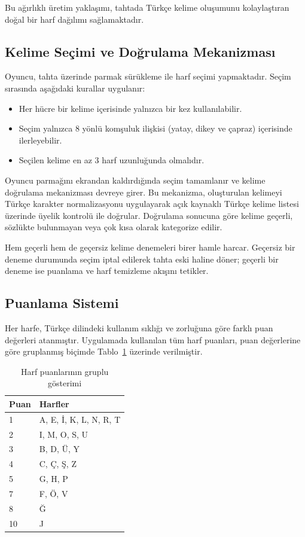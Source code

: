 \documentclass[conference]{IEEEtran}
\begin{document}
Bu ağırlıklı üretim yaklaşımı, tahtada Türkçe kelime oluşumunu kolaylaştıran doğal bir harf dağılımı sağlamaktadır.

\subsection{Kelime Seçimi ve Doğrulama Mekanizması}

Oyuncu, tahta üzerinde parmak sürükleme ile harf seçimi yapmaktadır. Seçim sırasında aşağıdaki kurallar uygulanır:

\begin{itemize}
  \item Her hücre bir kelime içerisinde yalnızca bir kez kullanılabilir.
  \item Seçim yalnızca 8 yönlü komşuluk ilişkisi (yatay, dikey ve çapraz) içerisinde ilerleyebilir.
  \item Seçilen kelime en az 3 harf uzunluğunda olmalıdır.
\end{itemize}

Oyuncu parmağını ekrandan kaldırdığında seçim tamamlanır ve kelime doğrulama mekanizması devreye girer. Bu mekanizma, oluşturulan kelimeyi Türkçe karakter normalizasyonu uygulayarak açık kaynaklı Türkçe kelime listesi \cite{turkish_word_list} üzerinde üyelik kontrolü ile doğrular. Doğrulama sonucuna göre kelime geçerli, sözlükte bulunmayan veya çok kısa olarak kategorize edilir.

Hem geçerli hem de geçersiz kelime denemeleri birer hamle harcar. Geçersiz bir deneme durumunda seçim iptal edilerek tahta eski haline döner; geçerli bir deneme ise puanlama ve harf temizleme akışını tetikler.

\subsection{Puanlama Sistemi}

Her harfe, Türkçe dilindeki kullanım sıklığı ve zorluğuna göre farklı puan değerleri atanmıştır. Uygulamada kullanılan tüm harf puanları, puan değerlerine göre gruplanmış biçimde Tablo~\ref{tab:letter-score-groups} üzerinde verilmiştir.

\begin{table}[H]
\centering
\caption{Harf puanlarının gruplu gösterimi}
\label{tab:letter-score-groups}
\begin{tabular}{ll}
\toprule
\textbf{Puan} & \textbf{Harfler} \\
\midrule
1 & A, E, İ, K, L, N, R, T \\
2 & I, M, O, S, U \\
3 & B, D, Ü, Y \\
4 & C, Ç, Ş, Z \\
5 & G, H, P \\
7 & F, Ö, V \\
8 & Ğ \\
10 & J \\
\bottomrule
\end{tabular}
\end{table}
\end{document}
